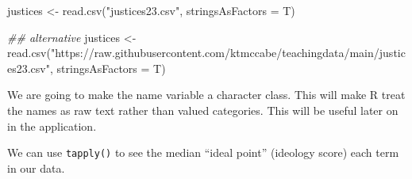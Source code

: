 \documentclass[
  letterpaper,
  DIV=11,
  numbers=noendperiod]{scrreprt}
\newenvironment{Shaded}{\begin{snugshade}}{\end{snugshade}}
\newcommand{\AttributeTok}[1]{\textcolor[rgb]{0.40,0.45,0.13}{#1}}
\newcommand{\DecValTok}[1]{\textcolor[rgb]{0.68,0.00,0.00}{#1}}
\newcommand{\DocumentationTok}[1]{\textcolor[rgb]{0.37,0.37,0.37}{\textit{#1}}}
\newcommand{\FloatTok}[1]{\textcolor[rgb]{0.68,0.00,0.00}{#1}}
\newcommand{\FunctionTok}[1]{\textcolor[rgb]{0.28,0.35,0.67}{#1}}
\newcommand{\NormalTok}[1]{\textcolor[rgb]{0.00,0.23,0.31}{#1}}
\newcommand{\OtherTok}[1]{\textcolor[rgb]{0.00,0.23,0.31}{#1}}
\newcommand{\SpecialCharTok}[1]{\textcolor[rgb]{0.37,0.37,0.37}{#1}}
\newcommand{\StringTok}[1]{\textcolor[rgb]{0.13,0.47,0.30}{#1}}
\begin{document}
\begin{Shaded}
\begin{Highlighting}[]
\NormalTok{justices }\OtherTok{\textless{}{-}} \FunctionTok{read.csv}\NormalTok{(}\StringTok{"justices23.csv"}\NormalTok{, }\AttributeTok{stringsAsFactors =}\NormalTok{ T)}

\DocumentationTok{\#\# alternative}
\NormalTok{justices }\OtherTok{\textless{}{-}} \FunctionTok{read.csv}\NormalTok{(}\StringTok{"https://raw.githubusercontent.com/ktmccabe/teachingdata/main/justices23.csv"}\NormalTok{, }\AttributeTok{stringsAsFactors =}\NormalTok{ T)}
\end{Highlighting}
\end{Shaded}

We are going to make the name variable a character class. This will make
R treat the names as raw text rather than valued categories. This will
be useful later on in the application.

\begin{Shaded}
\end{Shaded}

We can use \texttt{tapply()} to see the median ``ideal point'' (ideology
score) each term in our data.

\begin{Shaded}
\end{Shaded}
\end{document}
